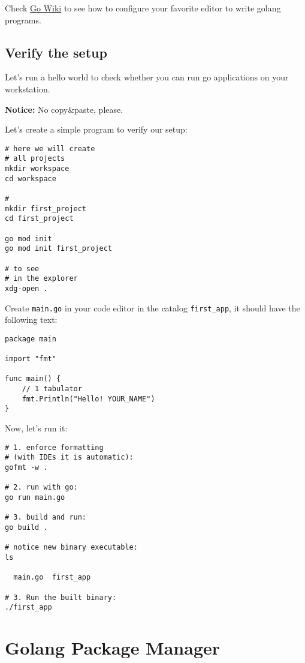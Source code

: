 \documentclass[11pt, letterpaper]{article}
\begin{document}
Check \href{https://github.com/golang/go/wiki/IDEsAndTextEditorPlugins}{Go Wiki} to see how to configure your favorite editor to write golang programs.

\subsection{Verify the setup}
Let's run a hello world to check whether you can run go applications on your workstation.

\bigskip
\textbf{Notice:} No copy\&paste, please.

\bigskip
Let's create a simple program to verify our setup:

\begin{verbatim}
# here we will create
# all projects
mkdir workspace
cd workspace

#
mkdir first_project
cd first_project

go mod init
go mod init first_project

# to see 
# in the explorer
xdg-open .
\end{verbatim}

Create \texttt{main.go} in your code editor in the catalog \texttt{first_app}, it should have the following text:

\begin{verbatim}
package main

import "fmt"

func main() {
	// 1 tabulator
	fmt.Println("Hello! YOUR_NAME")
}
\end{verbatim}

Now, let's run it:

\begin{verbatim}
# 1. enforce formatting 
# (with IDEs it is automatic):
gofmt -w .

# 2. run with go:
go run main.go

# 3. build and run:
go build .

# notice new binary executable:
ls

  main.go  first_app

# 3. Run the built binary:
./first_app
\end{verbatim}

\section{Golang Package Manager}
\end{document}
